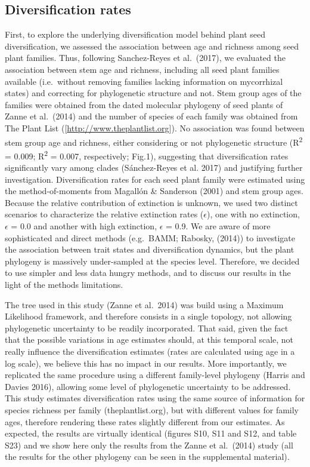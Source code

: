 \documentclass[12pt,]{article}
\begin{document}
\hypertarget{diversification-rates}{%
\subsection{Diversification rates}\label{diversification-rates}}

First, to explore the underlying diversification model behind plant seed
diversification, we assessed the association between age and richness
among seed plant families. Thus, following Sanchez-Reyes et al.~(2017),
we evaluated the association between stem age and richness, including
all seed plant families available (i.e.~without removing families
lacking information on mycorrhizal states) and correcting for
phylogenetic structure and not. Stem group ages of the families were
obtained from the dated molecular phylogeny of seed plants of Zanne et
al.~(2014) and the number of species of each family was obtained from
The Plant List ({[}\url{http://www.theplantlist.org}{]}). No association
was found between stem group age and richness, either considering or not
phylogenetic structure (R\textsuperscript{2} = 0.009;
R\textsuperscript{2} = 0.007, respectively; Fig.1), suggesting that
diversification rates significantly vary among clades (Sánchez-Reyes et
al. 2017) and justifying further investigation. Diversification rates
for each seed plant family were estimated using the method-of-moments
from Magallón \& Sanderson (2001) and stem group ages. Because the
relative contribution of extinction is unknown, we used two distinct
scenarios to characterize the relative extinction rates (\(\epsilon\)),
one with no extinction, \(\epsilon\) = 0.0 and another with high
extinction, \(\epsilon\) = 0.9. We are aware of more sophisticated and
direct methods (e.g.~BAMM; Rabosky, (2014)) to investigate the
association between trait states and diversification dynamics, but the
plant phylogeny is massively under-sampled at the species level.
Therefore, we decided to use simpler and less data hungry methods, and
to discuss our results in the light of the methods limitations.

The tree used in this study (Zanne et al.~2014) was build using a
Maximum Likelihood framework, and therefore consists in a single
topology, not allowing phylogenetic uncertainty to be readily
incorporated. That said, given the fact that the possible variations in
age estimates should, at this temporal scale, not really influence the
diversification estimates (rates are calculated using age in a log
scale), we believe this has no impact in our results. More importantly,
we replicated the same procedure using a different family-level
phylogeny (Harris and Davies 2016), allowing some level of phylogenetic
uncertainty to be addressed. This study estimates diversification rates
using the same source of information for species richness per family
(theplantlist.org), but with different values for family ages, therefore
rendering these rates slightly different from our estimates. As
expected, the results are virtually identical (figures S10, S11 and S12,
and table S23) and we show here only the results from the Zanne et
al.~(2014) study (all the results for the other phylogeny can be seen in
the supplemental material).
\end{document}
